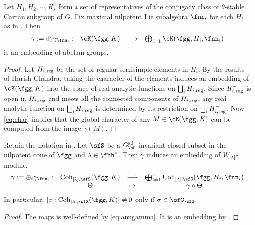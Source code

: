 \documentclass[counting_main.tex]{subfiles}
\begin{document}

\begin{cor}[c.f. {\cite{Mc}}]\label{cor:HC.embed}
  Let $H_{1}, H_{2}, \cdots, H_{s}$ form a set of representatives of the
  conjugacy class of $\theta$-stable Cartan subgroup of $G$. Fix maximal
  nilpotent Lie subalgebra $\fnn_{i}$ for each $H_{i}$ as in
  . Then
  \[
    \begin{array}{cccc}
      \gamma:=\oplus_{i} \gamma_{\fnn_{i}}: &\Grt(\fgg,K)
      &\longrightarrow & \bigoplus_{i=1}^{s} \Grt(\fgg,H_{i},\fnn_{i})\\
    \end{array}
  \]
  is an embedding of abelian groups.
\end{cor}
\begin{proof}
  Let $H_{i,\text{reg}}$ be the set of regular semisimple elements in $H_{i}$. By the
  results of Harish-Chandra, taking the character of the elements induces an
  embedding of $\Grt(\fgg,K)$ into the space of real analytic functions on
  $\bigsqcup_{i} H_{i,\text{reg}}$. Since $H^-_{i,\text{reg}}$ is open in $H_{i,\text{reg}}$ and meets all the
  connected components of $H_{i,\text{reg}}$, any real analytic function on
  $\bigsqcup_{i} H_{i,\text{reg}}$ is determined by its restriction on
  $\bigsqcup_{i} H^-_{i,\text{reg}}$. Now \eqref{eq:char} implies that the global character
  of any $M\in \Grt(\fgg,K)$ can be computed from the image $\gamma(M)$.
\end{proof}

\begin{cor}\label{cor:coh.HC}
  Retain the notation in .
  Let $\sfS$ be a $\Gcad$-invariant closed subset in the nilpotent cone of
  $\fgg$ and $\lambda\in \fhh^{*}$.
  Then $\gamma$ induces an embedding of $W_{[\lambda]}$-module.
  \[
    \begin{array}{cccc}
      \gamma:=\oplus_{i} \gamma_{\fnn_{i}}: &\Coh_{[\lambda],\sfS}(\fgg,K)
      &\longrightarrow & \bigoplus_{i=1}^{s} \Coh_{[\lambda],\sfS}(\fgg,H_{i},\fnn_{i})\\
      &\Theta& \mapsto &\gamma\circ \Theta
    \end{array}
  \]
  In particular, $[\sigma:\Coh_{[\lambda],\sfS}(\fgg,K)]\neq 0$ only if
  $\sigma\in \sfC_{\sfS}$.
\end{cor}
\begin{proof}
  The maps is well-defined by \eqref{eq:anngamma}. It is an embedding by
  .
\end{proof}
\end{document}
